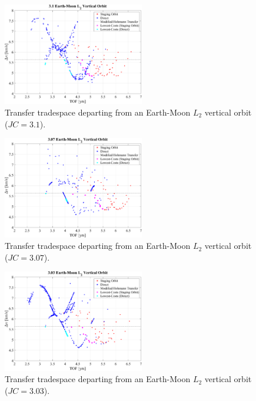 \begin{figure}[ht]
    \centering
    \includegraphics[width=0.55\textwidth]{figures/TradeSpace_L2Vertical_3_10.pdf}
    \caption{Transfer tradespace departing from an Earth-Moon $L_{2}$ vertical orbit ($JC=3.1$).}
\end{figure}

\begin{figure}[ht]
    \centering
    \includegraphics[width=0.55\textwidth]{figures/TradeSpace_L2Vertical_3_07.pdf}
    \caption{Transfer tradespace departing from an Earth-Moon $L_{2}$ vertical orbit ($JC=3.07$).}
\end{figure}

\begin{figure}[ht]
    \centering
    \includegraphics[width=0.55\textwidth]{figures/TradeSpace_L2Vertical_3_03.pdf}
    \caption{Transfer tradespace departing from an Earth-Moon $L_{2}$ vertical orbit ($JC=3.03$).}
\end{figure}


